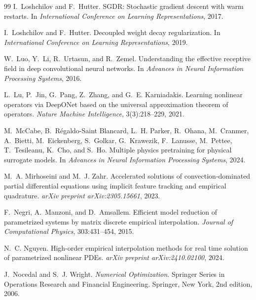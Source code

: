 \documentclass{article}
\begin{document}
\begin{thebibliography}{99}
I.~Loshchilov and F.~Hutter.
\newblock SGDR: Stochastic gradient descent with warm restarts.
\newblock In \emph{International Conference on Learning Representations},
2017.

I.~Loshchilov and F.~Hutter.
\newblock Decoupled weight decay regularization.
\newblock In \emph{International Conference on Learning Representations},
2019.

W.~Luo, Y.~Li, R.~Urtasun, and R.~Zemel.
\newblock Understanding the effective receptive field in deep
convolutional neural networks.
\newblock In \emph{Advances in Neural Information Processing Systems},
2016.

L.~Lu, P.~Jin, G.~Pang, Z.~Zhang, and G.~E. Karniadakis.
\newblock Learning nonlinear operators via DeepONet based on the
universal approximation theorem of operators.
\newblock \emph{Nature Machine Intelligence}, 3(3):218--229, 2021.

M.~McCabe, B.~R\'egaldo-Saint Blancard, L.~H. Parker, R.~Ohana,
M.~Cranmer, A.~Bietti, M.~Eickenberg, S.~Golkar, G.~Krawezik,
F.~Lanusse, M.~Pettee, T.~Tesileanu, K.~Cho, and S.~Ho.
\newblock Multiple physics pretraining for physical surrogate models.
\newblock In \emph{Advances in Neural Information Processing Systems},
2024.

M.~A. Mirhoseini and M.~J. Zahr.
\newblock Accelerated solutions of convection-dominated partial
differential equations using implicit feature tracking and empirical
quadrature.
\newblock \emph{arXiv preprint arXiv:2305.15661}, 2023.

F.~Negri, A.~Manzoni, and D.~Amsallem.
\newblock Efficient model reduction of parametrized systems by matrix
discrete empirical interpolation.
\newblock \emph{Journal of Computational Physics}, 303:431--454, 2015.

N.~C. Nguyen.
\newblock High-order empirical interpolation methods for real time
solution of parametrized nonlinear PDEs.
\newblock \emph{arXiv preprint arXiv:2410.02100}, 2024.

J.~Nocedal and S.~J. Wright.
\newblock \emph{Numerical Optimization}.
\newblock Springer Series in Operations Research and Financial
Engineering. Springer, New York, 2nd edition, 2006.


\end{thebibliography}
\end{document}
